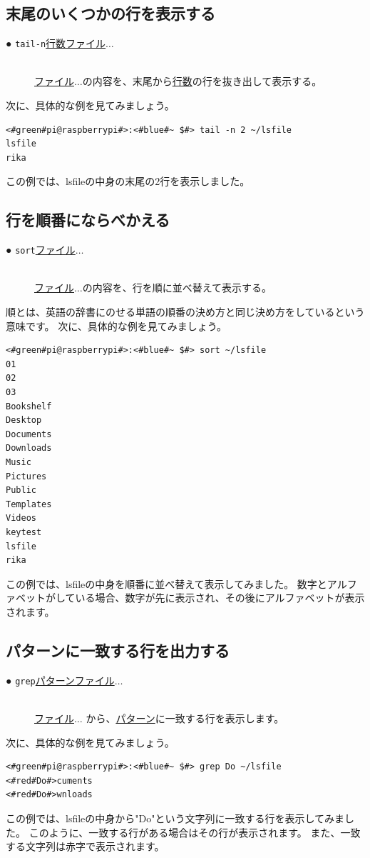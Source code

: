 \subsection{末尾のいくつかの行を表示する}
\begin{description}
    \item[● \texttt{tail}\textvisiblespace \texttt{-n}\textvisiblespace \underline{行数}\textvisiblespace \underline{ファイル}$\ldots$ ]\mbox{}\\
    \underline{ファイル}$\ldots$の内容を、末尾から\underline{行数}の行を抜き出して表示する。
\end{description}
次に、具体的な例を見てみましょう。
\begin{lstlisting}[caption=tailコマンドの実行例, label=shuf_example]
<#green#pi@raspberrypi#>:<#blue#~ $#> tail -n 2 ~/lsfile
lsfile
rika
\end{lstlisting}
この例では、lsfileの中身の末尾の2行を表示しました。

\subsection{行を順番にならべかえる}
\begin{description}
    \item[● \texttt{sort}\textvisiblespace \underline{ファイル}$\ldots$ ]\mbox{}\\
    \underline{ファイル}$\ldots$の内容を、行を順に並べ替えて表示する。
\end{description}
順とは、英語の辞書にのせる単語の順番の決め方と同じ決め方をしているという意味です。
次に、具体的な例を見てみましょう。
\begin{lstlisting}[caption=sortコマンドの実行例, label=sort_example]
<#green#pi@raspberrypi#>:<#blue#~ $#> sort ~/lsfile
01
02
03
Bookshelf
Desktop
Documents
Downloads
Music
Pictures
Public
Templates
Videos
keytest
lsfile
rika
\end{lstlisting}
この例では、lsfileの中身を順番に並べ替えて表示してみました。
数字とアルファベットがしている場合、数字が先に表示され、その後にアルファベットが表示されます。

\subsection{パターンに一致する行を出力する}
\begin{description}
    \item[● \texttt{grep}\textvisiblespace \underline{パターン}\textvisiblespace \underline{ファイル}$\ldots$ ]\mbox{}\\
    \underline{ファイル}$\ldots$ から、\underline{パターン}に一致する行を表示します。
\end{description}
次に、具体的な例を見てみましょう。
\begin{lstlisting}[caption=grepコマンドの実行例, label=grep_example]
<#green#pi@raspberrypi#>:<#blue#~ $#> grep Do ~/lsfile
<#red#Do#>cuments
<#red#Do#>wnloads
\end{lstlisting}
この例では、lsfileの中身から"Do"という文字列に一致する行を表示してみました。
このように、一致する行がある場合はその行が表示されます。
また、一致する文字列は赤字で表示されます。


